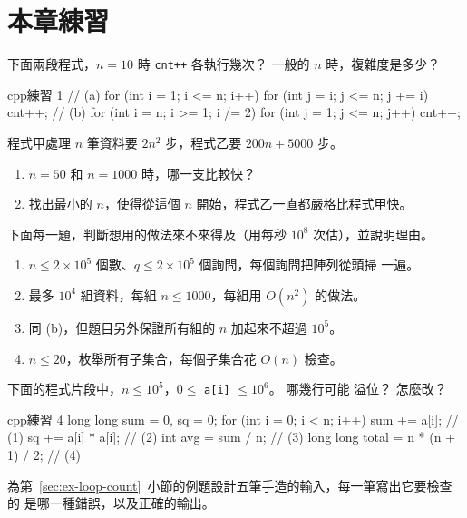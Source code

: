 \section{本章練習}
\label{sec:ch1-exercises}

\begin{drills}[label=drills:ch1]
\item 下面兩段程式，$n = 10$ 時 \texttt{cnt++} 各執行幾次？ 一般的 $n$ 時，複雜度是多少？
\begin{code}{cpp}{練習 1}
// (a)
for (int i = 1; i <= n; i++)
    for (int j = i; j <= n; j += i)
        cnt++;
// (b)
for (int i = n; i >= 1; i /= 2)
    for (int j = 1; j <= n; j++)
        cnt++;
\end{code}

\item 程式甲處理 $n$ 筆資料要 $2n^2$ 步，程式乙要 $200n + 5000$ 步。
\begin{enumerate}
\item $n = 50$ 和 $n = 1000$ 時，哪一支比較快？
\item 找出最小的 $n$，使得從這個 $n$ 開始，程式乙一直都嚴格比程式甲快。
\end{enumerate}

\item 下面每一題，判斷想用的做法來不來得及（用每秒 $10^8$ 次估），並說明理由。
\begin{enumerate}
\item $n \le 2 \times 10^5$ 個數、$q \le 2 \times 10^5$ 個詢問，每個詢問把陣列從頭掃
一遍。
\item 最多 $10^4$ 組資料，每組 $n \le 1000$，每組用 $O(n^2)$ 的做法。
\item 同 (b)，但題目另外保證所有組的 $n$ 加起來不超過 $10^5$。
\item $n \le 20$，枚舉所有子集合，每個子集合花 $O(n)$ 檢查。
\end{enumerate}

\item 下面的程式片段中，$n \le 10^5$，$0 \le$ \texttt{a[i]} $\le 10^6$。 哪幾行可能
溢位？ 怎麼改？
\begin{code}{cpp}{練習 4}
long long sum = 0, sq = 0;
for (int i = 0; i < n; i++) {
    sum += a[i];                       // (1)
    sq += a[i] * a[i];                 // (2)
}
int avg = sum / n;                     // (3)
long long total = n * (n + 1) / 2;     // (4)
\end{code}

\item 為第~\ref{sec:ex-loop-count}~小節的例題設計五筆手造的輸入，每一筆寫出它要檢查的
是哪一種錯誤，以及正確的輸出。
\end{drills}

